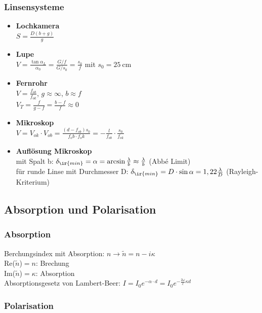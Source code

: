 \documentclass[german]{latex4ei/latex4ei_sheet}
\begin{document}
\begin{sectionbox}
\subsubsection{Linsensysteme}
\begin{itemize}
	\item \textbf{Lochkamera} \\
		$S=\frac{D(b+g)}{g}$
	\item \textbf{Lupe} \\
		$V=\frac{\tan \alpha_L}{\alpha_0}=\frac{G/f}{G/s_0}=\frac{s_0}{f}$ mit $s_0=\SI{25}{\centi \meter}$
	\item \textbf{Fernrohr} \\
		$V=\frac{f_{ob}}{f_{ok}}$, $g\approx \infty$, $b\approx f$ \\
		$V_T=\frac{f}{g-f}=\frac{b-f}{f}\approx 0$
	\item \textbf{Mikroskop} \\
		$V=V_{ok}\cdot V_{ob}=\frac{(d-f_{ob})s_0}{f_ob \cdot f_ok}=-\frac{l}{f_{ob}}\cdot \frac{s_0}{f_{ok}}$
	\item \textbf{Auflösung Mikroskop} \\
	mit Spalt b: $\delta_{\ir{min}} = \alpha = \arcsin\frac{\lambda}{b} \approx \frac{\lambda}{b}$ (Abbé Limit)\\
	für runde Linse mit Durchmesser D: $\delta_{\ir{min}} = D\cdot\sin\alpha = 1,22\frac{\lambda}{D}$ (Rayleigh-Kriterium)\\
\end{itemize}
\end{sectionbox}
\subsection{Absorption und Polarisation}

\subsubsection{Absorption}
Berchungsindex mit Absorption: $n\rightarrow \tilde{n}=n-i\kappa$\\ 
Re($\tilde{n}$)$=n$: Brechung \\
Im($\tilde{n}$)$=\kappa$: Absorption \\
Absorptionsgesetz von Lambert-Beer: $I=I_0e^{-\alpha \cdot d}=I_0e^{-\frac{2\omega}{c}\kappa d}$

\subsubsection{Polarisation}
\end{document}
